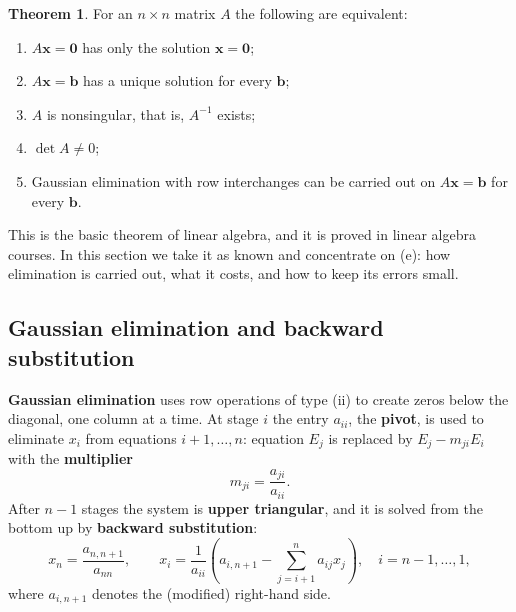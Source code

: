 \documentclass[11pt,a4paper]{article}
\numberwithin{equation}{section}
\theoremstyle{definition}
\newtheorem{thm}{Theorem}[subsection]
\begin{document}
\begin{thm}
\label{thm:invertible}
For an $n\times n$ matrix $A$ the following are equivalent:
\begin{enumerate}
\item[(a)] $A\mathbf x = \mathbf 0$ has only the solution $\mathbf x = \mathbf 0$;
\item[(b)] $A\mathbf x = \mathbf b$ has a unique solution for every $\mathbf b$;
\item[(c)] $A$ is nonsingular, that is, $A^{-1}$ exists;
\item[(d)] $\det A\neq0$;
\item[(e)] Gaussian elimination with row interchanges can be carried out on $A\mathbf x = \mathbf b$ for every $\mathbf b$.
\end{enumerate}
\end{thm}

This is the basic theorem of linear algebra, and it is proved in linear algebra courses. In this section we take it as known and
concentrate on (e): how elimination is carried out, what it costs, and how to keep its errors small.


\subsection{Gaussian elimination and backward substitution}
\label{sec:gauss}

\textbf{Gaussian elimination} uses row operations of type (ii) to create zeros below the diagonal, one column at a time. At stage $i$ the
entry $a_{ii}$, the \textbf{pivot}, is used to eliminate $x_i$ from equations $i+1,\dots,n$: equation $E_j$ is replaced by $E_j-m_{ji}E_i$
with the \textbf{multiplier}
$$m_{ji} = \frac{a_{ji}}{a_{ii}} .$$
After $n-1$ stages the system is \textbf{upper triangular}, and it is solved from the bottom up by \textbf{backward substitution}:
$$x_n = \frac{a_{n,n+1}}{a_{nn}},\qquad x_i = \frac{1}{a_{ii}}\left(a_{i,n+1}-\sum_{j=i+1}^na_{ij}x_j\right),\quad i = n-1,\dots,1,$$
where $a_{i,n+1}$ denotes the (modified) right-hand side.
\end{document}
